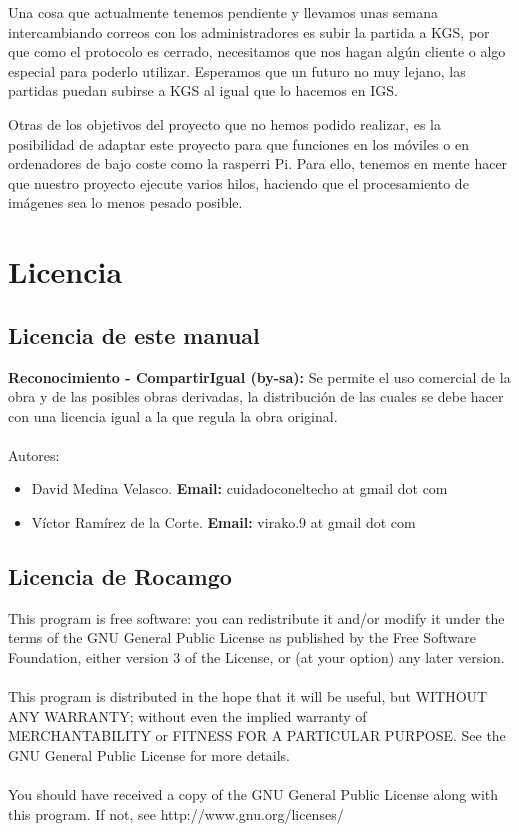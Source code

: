 \documentclass[12pt,a4paper]{report}
\begin{document}
Una cosa que actualmente tenemos pendiente y llevamos unas semana intercambiando
correos con los administradores es subir la partida a KGS, por que como el
protocolo es cerrado, necesitamos que nos hagan algún cliente o algo especial
para poderlo utilizar. Esperamos que un futuro no muy lejano, las partidas
puedan subirse a KGS al igual que lo hacemos en IGS. 

Otras de los objetivos del proyecto que no hemos podido realizar, es la
posibilidad de adaptar este proyecto para que funciones en los móviles o en
ordenadores de bajo coste como la rasperri Pi. Para ello, tenemos en mente hacer
que nuestro proyecto ejecute varios hilos, haciendo que el procesamiento de
imágenes sea lo menos pesado posible.


\chapter{Licencia}

\section{Licencia de este manual}

\textbf{Reconocimiento - CompartirIgual (by-sa):} Se permite el uso comercial de
la obra y de las posibles obras derivadas, la distribución de las cuales se debe
hacer con una licencia igual a la que regula la obra original. \\ \\


Autores: 
\begin{itemize} 
    \item David Medina Velasco. \textbf{Email:} cuidadoconeltecho at gmail dot com 
    \item Víctor Ramírez de la Corte. \textbf{Email:} virako.9 at gmail dot com 
\end{itemize}

\section{Licencia de Rocamgo}

This program is free software: you can redistribute it and/or modify it under
the terms of the GNU General Public License as published by the Free Software
Foundation, either version 3 of the License, or (at your option) any later
version. \\ \\ This program is distributed in the hope that it will be useful,
but WITHOUT ANY WARRANTY; without even the implied warranty of MERCHANTABILITY
or FITNESS FOR A PARTICULAR PURPOSE.  See the GNU General Public License for
more details. \\ \\ You should have received a copy of the GNU General Public
License along with this program.  If not, see http://www.gnu.org/licenses/
\end{document}

